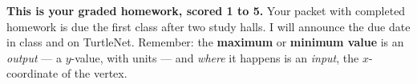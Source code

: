 \documentclass[12pt]{article}
\begin{document}

\boxguard[8]
\begin{remindbox}
\small
\textbf{This is your graded homework, scored 1 to 5.} Your packet with completed homework is due the first class
after two study halls. I will announce the due date in class and on TurtleNet. Remember: the
\textbf{maximum} or \textbf{minimum value} is an \emph{output} --- a $y$-value, with units --- and
\emph{where} it happens is an \emph{input}, the $x$-coordinate of the vertex.
\end{remindbox}

\vspace{0.08in}
\end{document}
